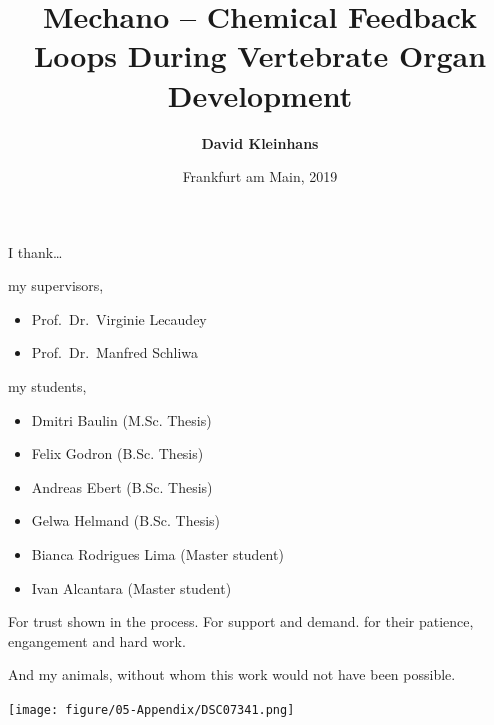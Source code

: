 \documentclass[11pt,singlespacinge,twoside]{reedthesis} %
\title{\textbf{Mechano -- Chemical Feedback Loops \linebreak During Vertebrate Organ Development}}
\author{\textbf{David Kleinhans}}
\date{Frankfurt am Main, 2019}
\providecommand{\tightlist}{%
  \setlength{\itemsep}{0pt}\setlength{\parskip}{0pt}}
\begin{document}
  \maketitle

\frontmatter %
\pagestyle{empty} %
  \begin{acknowledgements}
    I thank\ldots{}\newline
    
    \noindent my supervisors,
    \begin{itemize}
    \tightlist
    \item
      Prof.~Dr.~Virginie Lecaudey
    \item
      Prof.~Dr.~Manfred Schliwa
    \end{itemize}
    \noindent my students,
    \begin{itemize}
    \tightlist
    \item
      Dmitri Baulin (M.Sc. Thesis)
    \item
      Felix Godron (B.Sc. Thesis)
    \item
      Andreas Ebert (B.Sc. Thesis)
    \item
      Gelwa Helmand (B.Sc. Thesis)
    \item
      Bianca Rodrigues Lima (Master student)
    \item
      Ivan Alcantara (Master student)
    \end{itemize}
    For trust shown in the process. For support and demand. for their patience, engangement and hard work.\newline
    
    \noindent And my animals, without whom this work would not have been possible.
    \vspace{0.5cm}
\begin{center}
\texttt{[image: figure/05-Appendix/DSC07341.png]}
\end{center}
  \end{acknowledgements}
\end{document}
